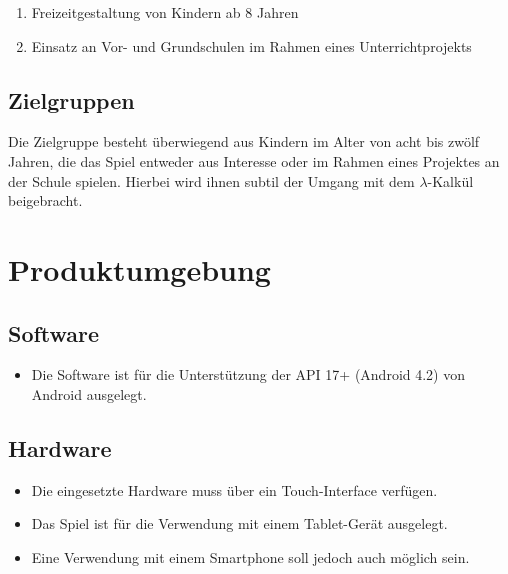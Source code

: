\documentclass{scrartcl}
\begin{document}
\begin{enumerate}
	\item Freizeitgestaltung von Kindern ab 8 Jahren
	\item Einsatz an Vor- und Grundschulen im Rahmen eines Unterrichtprojekts
\end{enumerate}

\subsection{Zielgruppen}

Die Zielgruppe besteht überwiegend aus Kindern im Alter von acht bis zwölf Jahren, die das Spiel entweder aus Interesse oder im Rahmen eines Projektes an der Schule spielen. Hierbei wird ihnen subtil der Umgang mit dem $\lambda$-Kalkül beigebracht.

\clearpage








\section{Produktumgebung}

\subsection{Software}

\begin{itemize}
	\item Die Software ist für die Unterstützung der API 17+ (Android 4.2) von Android ausgelegt.
\end{itemize}

\subsection{Hardware}

\begin{itemize}
	\item Die eingesetzte Hardware muss über ein Touch-Interface verfügen.
	\item Das Spiel ist für die Verwendung mit einem Tablet-Gerät ausgelegt.
	\item Eine Verwendung mit einem Smartphone soll jedoch auch möglich sein.
\end{itemize}

\clearpage
\end{document}
